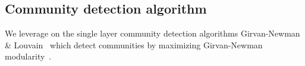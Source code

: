 \subsection{Community detection algorithm}
We leverage on the single layer community detection algorithms Girvan-Newman~\cite{newman2004finding} \& Louvain~\cite{blondel2008fast}
which detect communities by maximizing Girvan-Newman modularity~\cite{newman2006modularity}.

